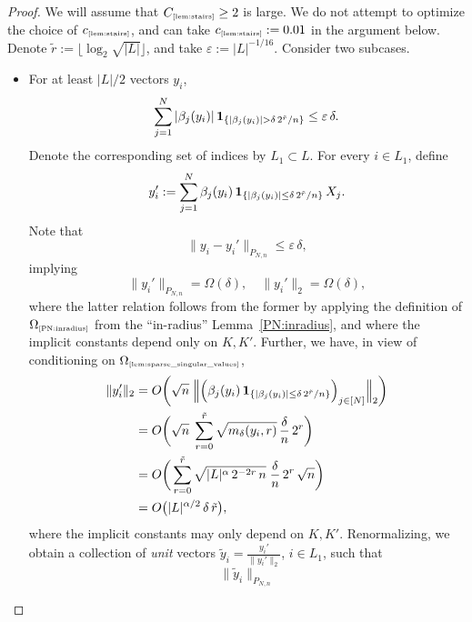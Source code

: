 \documentclass[11pt]{amsart}
\theoremstyle{definition}
\theoremstyle{plain}
\begin{document}
\begin{proof}
We will assume that $C_{\text{\tiny\ref{lem:stairs}}}\geq 2$
is large. We do not attempt to optimize
the choice of $c_{\text{\tiny\ref{lem:stairs}}}$,
and can take $c_{\text{\tiny\ref{lem:stairs}}}:=0.01$
in the argument below.
Denote $\tilde r:=\lfloor \log_2\sqrt{|L|}\rfloor$,
and take $\varepsilon:=|L|^{-1/16}$.
Consider two subcases.
\begin{itemize}
    \item[1.] For at least $|L|/2$ vectors $y_i$,
    $$
    \sum_{j=1}^N |\beta_j(y_i)|\,
    {\bf 1}_{\{|\beta_j(y_i)|>\delta\,2^{\tilde r}/n\}}
    \leq \varepsilon\,\delta.
    $$
    Denote the corresponding set of indices by $L_1\subset L$.
    For every $i\in L_1$, define
    $$
    y_i':=\sum\limits_{j=1}^N \beta_j(y_i)\,
    {\bf 1}_{\{|\beta_j(y_i)|\leq \delta\,2^{\tilde r}/n\}}\,X_j.
    $$
    Note that
    \begin{equation}\label{eq:leqepsdelta}
    \|y_i-y_i'\|_{P_{N,n}}\leq \varepsilon\,\delta,
    \end{equation}
    implying
    \begin{equation}\label{eq:ell2ofyiprime}
    \|y_i'\|_{P_{N,n}}=\Omega(\delta),\quad
    \|y_i'\|_2=\Omega(\delta),
    \end{equation}
    where the latter relation follows from the 
    former by applying the definition of
    $\Omega_{\text{\tiny\ref{PN:inradius}}}$
    from the ``in-radius'' Lemma~\ref{PN:inradius},
    and where the implicit constants depend only on $K,K'$.
    Further, we have, in view of conditioning on 
    $\Omega_{\text{\tiny\ref{lem:sparse_singular_values}}}$,
    \begin{align*}
    \|y_i'\|_2
    &=O\bigg(\sqrt{n}\;\Big\|\Big(\beta_j(y_i)\,
    {\bf 1}_{\{|\beta_j(y_i)|\leq \delta\,2^{\tilde r}/n\}}\Big)_{j\in[N]}\Big\|_2\bigg)\\
    &=O\bigg(\sqrt{n}\;\sum\limits_{r=0}^{\tilde r}
    \sqrt{m_\delta(y_i,r)}\,\frac{\delta}{n}\,2^{r}
    \bigg)\\
    &= O\bigg(\sum\limits_{r=0}^{\tilde r}
    \sqrt{|L|^{\alpha}\,2^{-2r}\,n}\;
    \frac{\delta}{n}\,2^{r}\,\sqrt{n}\bigg)\\
    &=O\big(|L|^{\alpha/2}
    \,\delta\,\tilde r\big),
    \end{align*}
    where the implicit constants may only depend on $K,K'$.
    Renormalizing, we obtain a collection of {\it unit}
    vectors $\tilde y_i=\frac{y_i'}{\|y_i'\|_2}$, $i\in L_1$, such that
    $$
    \|\tilde y_i\|_{P_{N,n}}
$$
\end{itemize}
\end{proof}
\end{document}

